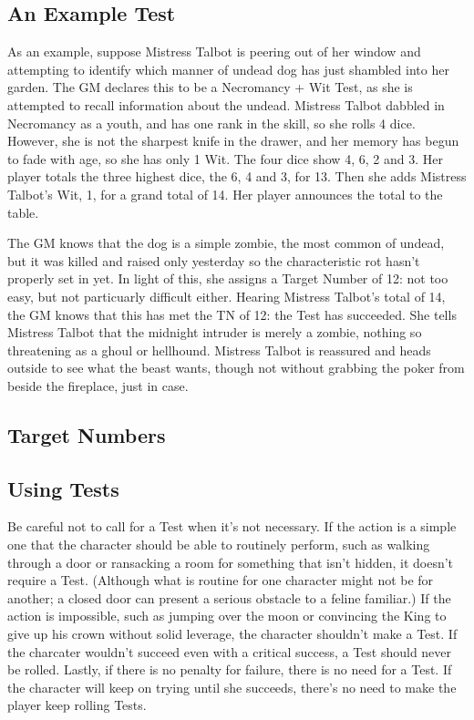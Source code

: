 \subsection{An Example Test}

As an example, suppose Mistress Talbot is peering out of her window and attempting to identify which manner of undead dog has just shambled into her garden.
The GM declares this to be a Necromancy + Wit Test, as she is attempted to recall information about the undead.
Mistress Talbot dabbled in Necromancy as a youth, and has one rank in the skill, so she rolls 4 dice.
However, she is not the sharpest knife in the drawer, and her memory has begun to fade with age, so she has only 1 Wit.
The four dice show 4, 6, 2 and 3.
Her player totals the three highest dice, the 6, 4 and 3, for 13.
Then she adds Mistress Talbot's Wit, 1, for a grand total of 14.
Her player announces the total to the table.

The GM knows that the dog is a simple zombie, the most common of undead, but it was killed and raised only yesterday so the characteristic rot hasn't properly set in yet.
In light of this, she assigns a Target Number of 12: not too easy, but not particuarly difficult either.
Hearing Mistress Talbot's total of 14, the GM knows that this has met the TN of 12: the Test has succeeded.
She tells Mistress Talbot that the midnight intruder is merely a zombie, nothing so threatening as a ghoul or hellhound.
Mistress Talbot is reassured and heads outside to see what the beast wants, though not without grabbing the poker from beside the fireplace, just in case.

\subsection{Target Numbers}



\subsection{Using Tests}

Be careful not to call for a Test when it's not necessary.
If the action is a simple one that the character should be able to routinely perform, such as walking through a door or ransacking a room for something that isn't hidden, it doesn't require a Test.
(Although what is routine for one character might not be for another; a closed door can present a serious obstacle to a feline familiar.)
If the action is impossible, such as jumping over the moon or convincing the King to give up his crown without solid leverage, the character shouldn't make a Test.
If the charcater wouldn't succeed even with a critical success, a Test should never be rolled.
Lastly, if there is no penalty for failure, there is no need for a Test.
If the character will keep on trying until she succeeds, there's no need to make the player keep rolling Tests.

